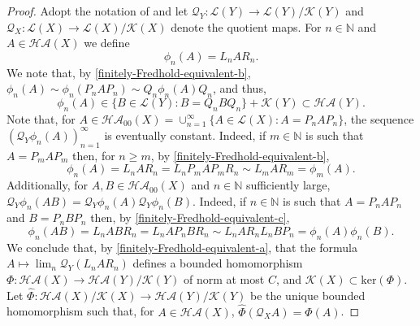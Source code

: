 \documentclass[11pt]{amsart}
\theoremstyle{definition}
\newcommand{\N}{\mathbb{N}}
\numberwithin{equation}{section}
\begin{document}
\begin{proof}
Adopt the notation of  and let $\mathcal{Q}_Y:\mathcal{L}(Y)\to\mathcal{L}(Y)/\mathcal{K}(Y)$ and $\mathcal{Q}_X:\mathcal{L}(X)\to\mathcal{L}(X)/\mathcal{K}(X)$ denote the quotient maps. For $n\in\N$ and $A\in\mathcal{HA}(X)$ we define
\[\phi_n(A) = L_nAR_n.\]
We note that, by \cref{finitely-Fredhold-equivalent-b}, $\phi_n(A) \sim \phi_n(P_nAP_n) \sim Q_n\phi_n(A)Q_n$, and thus,
\[\phi_n(A)\in \{B\in\mathcal{L}(Y):B = Q_nBQ_n\}+\mathcal{K}(Y)\subset\mathcal{HA}(Y).\]
Note that, for $A\in\mathcal{HA}_{00}(X) = \cup_{n=1}^\infty\{A\in\mathcal{L}(X):A=P_nAP_n\}$, the sequence $(\mathcal{Q}_Y\phi_n(A))_{n=1}^\infty$ is eventually constant. Indeed, if $m\in\N$ is such that $A = P_mAP_m$ then, for $n\geq m$, by \cref{finitely-Fredhold-equivalent-b},
\[\phi_n(A) = L_nAR_n = L_nP_mAP_mR_n\sim L_m AR_m = \phi_m(A).\]
Additionally, for $A,B\in\mathcal{HA}_{00}(X)$ and $n\in\N$ sufficiently large, $\mathcal{Q}_Y\phi_n(AB) = \mathcal{Q}_Y\phi_n(A)\mathcal{Q}_Y\phi_n(B)$. Indeed, if $n\in\N$ is such that $A=P_nAP_n$ and $B = P_nBP_n$ then, by \cref{finitely-Fredhold-equivalent-c},
\[\phi_n(AB) = L_nABR_n = L_nAP_nBR_n\sim L_nAR_nL_nBP_n = \phi_n(A)\phi_n(B).\]
We conclude that, by \cref{finitely-Fredhold-equivalent-a}, that the formula $A \mapsto \lim_n\mathcal{Q}_Y(L_nAR_n)$ defines a bounded homomorphism $\Phi:\mathcal{HA}(X)\to \mathcal{HA}(Y)/\mathcal{K}(Y)$ of norm at most $C$, and $\mathcal{K}(X)\subset \mathrm{ker}(\Phi)$. Let $\widehat\Phi:\mathcal{HA}(X)/\mathcal{K}(X)\to\mathcal{HA}(Y)/\mathcal{K}(Y)$ be the unique bounded homomorphism such that, for $A\in\mathcal{HA}(X)$, $\widehat \Phi(\mathcal{Q}_XA) = \Phi(A)$.


\end{proof}
\end{document}
